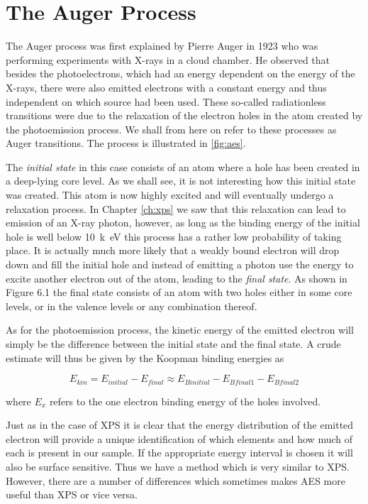\chapter{The Auger Process}\label{ch:auger}
The Auger process was first explained by  Pierre Auger in 1923 who was performing experiments with X-rays in a cloud chamber. He observed that besides the photoelectrons, which had an energy dependent on the energy of the X-rays, there were also emitted electrons with a constant energy and thus independent on which source had been used. These so-called radiationless transitions were due  to the relaxation of the electron holes in the atom created by the photoemission process. We shall from here on refer to these processes as Auger transitions. The process is illustrated in \autoref{fig:aes}.

The {\em initial state} in this case consists of an atom where a hole has been created in a deep-lying core level. As we shall see, it is not interesting how this initial state was created. This atom is now highly excited and will eventually undergo a relaxation process. In Chapter \ref{ch:xps} we saw that this relaxation can lead to emission of an X-ray photon, however, as long as the binding energy of the initial hole is well below \SI{10}{k\electronvolt} this process has a rather low probability of taking place. It is actually much more likely that a  weakly bound electron will drop down and fill the initial hole and instead of emitting a photon use the energy to excite another electron out of the atom, leading to the {\em final state}. As  shown in Figure 6.1 the final state consists of an atom with two holes either in some core levels, or in the  valence  levels or any combination thereof.

As for the photoemission process, the  kinetic energy of the emitted electron will simply be the difference between the initial state and the final state. A crude estimate will thus be given by the Koopman binding energies as

\begin{equation}\label{eq:ekinkoopman}
E_{kin}=E_{initial}-E_{final}\approx E_{B          initial}-E_{Bfinal1}-E_{Bfinal2}
\end{equation}

\noindent where $E_x$ refers to the one electron binding energy of the holes involved.

Just as in the case of XPS it is clear that the energy distribution of the emitted electron will provide a unique identification of which elements and how much of each is present in our sample. If the appropriate energy interval is chosen it will also be surface sensitive. Thus we have a method which is very  similar  to XPS. However, there are a number of differences which sometimes makes AES more useful than XPS or vice versa.

